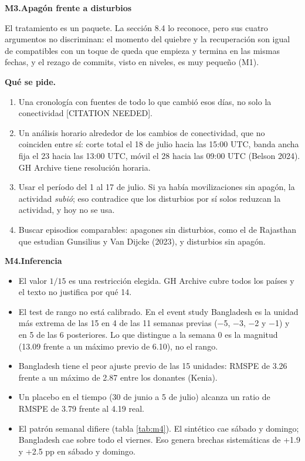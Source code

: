 \documentclass[11pt,a4paper]{article}
\newcommand{\coment}[2]{\medskip\noindent\textbf{#1.\enspace #2}\par\nopagebreak}
\newcommand{\pide}{\par\noindent\textbf{Qué se pide.}\enspace}
\begin{document}
\coment{M3}{Apagón frente a disturbios}
El tratamiento es un paquete. La sección 8.4 lo reconoce, pero sus cuatro argumentos no discriminan:
el momento del quiebre y la recuperación son igual de compatibles con un toque de queda que empieza y
termina en las mismas fechas, y el rezago de commits, visto en niveles, es muy pequeño (M1).
\pide
\begin{enumerate}
\item Una cronología con fuentes de todo lo que cambió esos días, no solo la conectividad
[CITATION NEEDED].
\item Un análisis horario alrededor de los cambios de conectividad, que no coinciden entre sí: corte
total el 18 de julio hacia las 15:00 UTC, banda ancha fija el 23 hacia las 13:00 UTC, móvil el 28
hacia las 09:00 UTC (Belson 2024). GH Archive tiene resolución horaria.
\item Usar el período del 1 al 17 de julio. Si ya había movilizaciones sin apagón, la actividad
\emph{subió}; eso contradice que los disturbios por sí solos reduzcan la actividad, y hoy no se usa.
\item Buscar episodios comparables: apagones sin disturbios, como el de Rajasthan que estudian
Gunsilius y Van Dijcke (2023), y disturbios sin apagón.
\end{enumerate}

\coment{M4}{Inferencia}
\begin{itemize}
\item El valor $1/15$ es una restricción elegida. GH Archive cubre todos los países y el texto no
justifica por qué 14.
\item El test de rango no está calibrado. En el event study Bangladesh es la unidad más extrema de las
15 en 4 de las 11 semanas previas (−5, −3, −2 y −1) y en 5 de las 6 posteriores. Lo que distingue a la
semana 0 es la magnitud (13.09 frente a un máximo previo de 6.10), no el rango.
\item Bangladesh tiene el peor ajuste previo de las 15 unidades: RMSPE de 3.26 frente a un máximo de
2.87 entre los donantes (Kenia).
\item Un placebo en el tiempo (30 de junio a 5 de julio) alcanza un ratio de RMSPE de 3.79 frente al
4.19 real.
\item El patrón semanal difiere (tabla \ref{tab:m4}). El sintético cae sábado y domingo; Bangladesh
cae sobre todo el viernes. Eso genera brechas sistemáticas de +1.9 y +2.5 pp en sábado y domingo.
\end{itemize}
\end{document}
